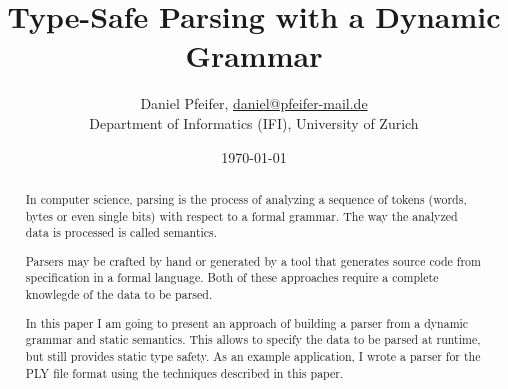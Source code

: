 \documentclass[a4paper, parskip=half, twocolumn]{scrartcl}
\title{Type-Safe Parsing with a Dynamic Grammar}
\author{Daniel Pfeifer,
\href{mailto:daniel@pfeifer-mail.de}{daniel@pfeifer-mail.de} \\
Department of Informatics (IFI), University of Zurich}
\date{\today}
\begin{document}
\maketitle

\begin{abstract}
In computer science, parsing is the process of analyzing a sequence of tokens
(words, bytes or even single bits) with respect to a formal grammar. The way
the analyzed data is processed is called semantics.

Parsers may be crafted by hand or generated by a tool that generates source code
from specification in a formal language. Both of these approaches require a
complete knowlegde of the data to be parsed.

In this paper I am going to present an approach of building a parser from a
dynamic grammar and static semantics. This allows to specify the data to be
parsed at runtime, but still provides static type safety. As an example
application, I wrote a parser for the PLY file format using the techniques
described in this paper.
\end{abstract}











\end{document}
